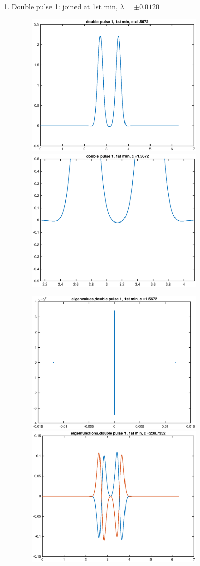 \documentclass[12pt]{article}
\begin{document}
\begin{enumerate}
	\item Double pulse 1: joined at 1st min, $\lambda = \pm 0.0120$
	\begin{figure}[H]
	\includegraphics[width=8.5cm]{KdVdouble1.eps}
	\includegraphics[width=8.5cm]{KdVdouble1zoom.eps}
	\end{figure}
	\begin{figure}[H]
	\includegraphics[width=8.5cm]{KdVdouble1eig.eps}
	\includegraphics[width=8.5cm]{KdVdouble1eigfn.eps}
	\end{figure}


\end{enumerate}
\end{document}
